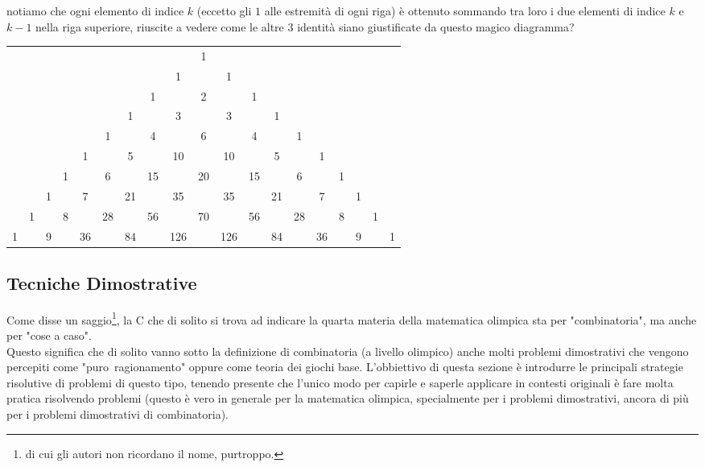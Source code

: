 \documentclass[11pt]{scrartcl}
\begin{document}
	notiamo che ogni elemento di indice $k$ (eccetto gli $1$ alle estremità di ogni riga) è ottenuto sommando tra loro i due elementi di indice $k$ e $k-1$ nella riga superiore, riuscite a vedere come le altre $3$ identità siano giustificate da questo magico diagramma?
	\begin{center}
		\setlength{\tabcolsep}{5pt}
		\begin{tabular}{ccccccccccccccccccc}
			    &   &   &   &   &   &   &   &   &1  &   &   &   &   &    &   &   &   &    \\
			    &   &   &   &   &   &   &   &1  &   &1  &   &   &   &    &   &   &   &    \\
			    &   &   &   &   &   &   &1  &   &2  &   & 1 &   &   &    &   &   &   &    \\
			    &   &   &   &   &   &1  &   &3  &   &3  &   & 1 &   &    &   &   &   &    \\
			    &   &   &   &   &1  &   &4  &   &6  &   & 4 &   & 1 &    &   &   &   &    \\
			    &   &   &   &1  &   &5  &   &10 &   &10 &   & 5 &   & 1  &   &   &   &    \\
			    &   &   & 1 &   &6  &   &15 &   &20 &   & 15&   & 6 &    & 1 &   &   &    \\
			    &   & 1 &   &7  &   &21 &   &35 &   &35 &   & 21&   & 7  &   & 1 &   &    \\
			    & 1 &   & 8 &   &28 &   &56 &   &70 &   & 56&   & 28&    & 8 &   & 1 &    \\
			  1 &   & 9 &   &36 &   &84 &   &126&   &126&   & 84&   & 36 &   & 9 &   & 1  \\
		\end{tabular}
	\end{center}

	\newpage
	
	\subsection{Tecniche Dimostrative}
	Come disse un saggio\footnote{di cui gli autori non ricordano il nome, purtroppo.}, la C che di solito si trova ad indicare la quarta materia della matematica olimpica sta per "combinatoria", ma anche per "cose a caso". \\
	Questo significa che di solito vanno sotto la definizione di combinatoria (a livello olimpico) anche molti problemi dimostrativi che vengono percepiti come \mbox{"puro ragionamento"} oppure come teoria dei giochi base. L'obbiettivo di questa sezione è introdurre le principali strategie risolutive di problemi di questo tipo, tenendo presente che l'unico modo per capirle e saperle applicare in contesti originali è fare molta pratica risolvendo problemi (questo è vero in generale per la matematica olimpica, specialmente per i problemi dimostrativi, ancora di più per i problemi dimostrativi di combinatoria).
	
\end{document}

